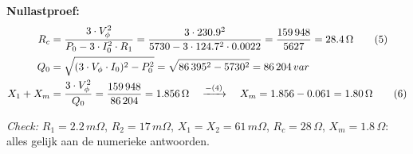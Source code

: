 \begin{oefenblok}
    \textbf{Nullastproef:}
    \begin{align}
        R_c &= \frac{3 \cdot V_\phi^2}{P_0 - 3 \cdot I_0^2 \cdot R_1}
        = \frac{3 \cdot 230.9^2}{5730 - 3 \cdot 124.7^2 \cdot 0.0022} = \frac{159\,948}{5627} = 28.4\,\Omega \tag{5} \\
        Q_0 &= \sqrt{(3 \cdot V_\phi \cdot I_0)^2 - P_0^2} = \sqrt{86\,395^2 - 5730^2} = 86\,204\,var \notag \\
        X_1 + X_m &= \frac{3 \cdot V_\phi^2}{Q_0} = \frac{159\,948}{86\,204} = 1.856\,\Omega
        \quad \xrightarrow{-(4)} \quad X_m = 1.856 - 0.061 = 1.80\,\Omega \tag{6}
    \end{align}

    \textit{Check:} $R_1 = 2.2\,m\Omega$, $R_2 = 17\,m\Omega$, $X_1 = X_2 = 61\,m\Omega$,
    $R_c = 28\,\Omega$, $X_m = 1.8\,\Omega$: alles gelijk aan de numerieke antwoorden.
\end{oefenblok}

